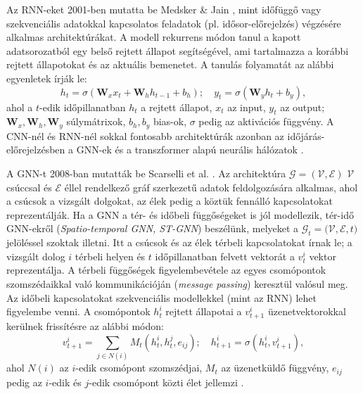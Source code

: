 \documentclass[12pt,a4paper]{article}
\begin{document}
Az RNN-eket 2001-ben mutatta be Medsker \& Jain \cite{medsker_recurrent_2001}, mint időfüggő vagy szekvenciális adatokkal kapcsolatos feladatok (pl. idősor-előrejelzés) végzésére alkalmas architektúrákat. A modell rekurrens módon tanul a kapott adatsorozatból egy belső rejtett állapot segítségével, ami tartalmazza a korábbi rejtett állapotokat és az aktuális bemenetet. A tanulás folyamatát az alábbi egyenletek írják le:
\[
h_t=\sigma(\mathbf{W}_xx_t+\mathbf{W}_hh_{t-1}+b_h); \quad y_t=\sigma(\mathbf{W}_yh_t+b_y),
\]
ahol a $t$-edik időpillanatban $h_t$ a rejtett állapot, $x_t$ az input, $y_t$ az output; $\mathbf{W}_x, \mathbf{W}_h, \mathbf{W}_y$ súlymátrixok, $b_h, b_y$ bias-ok, $\sigma$ pedig az aktivációs függvény. A CNN-nél és RNN-nél sokkal fontosabb architektúrák azonban az időjárás-előrejelzésben a GNN-ek és a transzformer alapú neurális hálózatok \cite{shi_deep_2025}.

A GNN-t 2008-ban mutatták be Scarselli et al. \cite{scarselli_graph_2008}. Az architektúra $\mathcal{G}=(\mathcal{V, E})$ $\mathcal{V}$ csúccsal és $\mathcal{E}$ éllel rendelkező gráf szerkezetű adatok feldolgozására alkalmas, ahol a csúcsok a vizsgált dolgokat, az élek pedig a köztük fennálló kapcsolatokat reprezentálják. Ha a GNN a tér- és időbeli függőségeket is jól modellezik, tér-idő GNN-ekről (\textit{Spatio-temporal GNN, ST-GNN}) beszélünk, melyeket a $\mathcal{G}_t=\mathcal{(V,E},t)$ jelöléssel szoktak illetni. Itt a csúcsok és az élek térbeli kapcsolatokat írnak le; a vizsgált dolog $i$ térbeli helyen és $t$ időpillanatban felvett vektorát a $v_t^i$ vektor reprezentálja. A térbeli függőségek figyelembevétele az egyes csomópontok szomszédaikkal való kommunikációján (\textit{message passing}) keresztül valósul meg. Az időbeli kapcsolatokat szekvenciális modellekkel (mint az RNN) lehet figyelembe venni. A csomópontok $h_t^i$ rejtett állapotai a $v^i_{t+1}$ üzenetvektorokkal kerülnek frissítésre az alábbi módon:
\[
v_{t+1}^i = \sum_{j \in N(i)} M_t(h_t^i, h_t^j, e_{ij}); \quad h_{t+1}^i = \sigma(h_t^i, v_{t+1}^i),
\]
ahol $N(i)$ az $i$-edik csomópont szomszédjai, $M_t$ az üzenetküldő függvény, $e_{ij}$ pedig az $i$-edik és $j$-edik csomópont közti élet jellemzi \cite{shi_deep_2025}.
\end{document}
